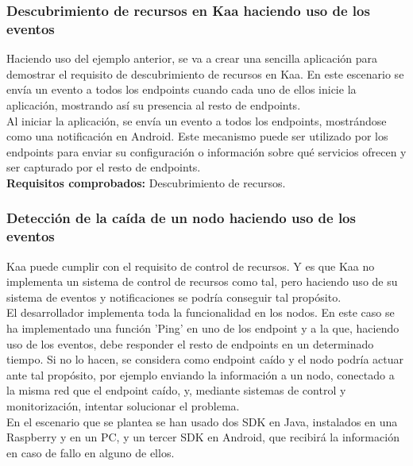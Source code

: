 \documentclass[12pt, twoside]{book}
\begin{document}
\subsubsection*{Descubrimiento de recursos en Kaa haciendo uso de los eventos}
Haciendo uso del ejemplo anterior, se va a crear una sencilla aplicación para demostrar el requisito de descubrimiento de recursos en Kaa. En este escenario se envía un evento a todos los endpoints cuando cada uno de ellos inicie la aplicación, mostrando así su presencia al resto de endpoints.\\
Al iniciar la aplicación, se envía un evento a todos los endpoints, mostrándose como una notificación en Android. Este mecanismo puede ser utilizado por los endpoints para enviar su configuración o información sobre qué servicios ofrecen y ser capturado por el resto de endpoints.\\
\textbf{Requisitos comprobados: } Descubrimiento de recursos.

\subsubsection*{Detección de la caída de un nodo haciendo uso de los eventos}
Kaa puede cumplir con el requisito de control de recursos. Y es que Kaa  no implementa un sistema de control de recursos como tal, pero haciendo uso de su sistema de eventos y notificaciones se podría conseguir tal propósito.\\
El desarrollador implementa toda la funcionalidad en los nodos. En este caso se ha implementado una función 'Ping' en uno de los endpoint y a la que, haciendo uso de los eventos, debe responder el resto de endpoints en un determinado tiempo. Si no lo hacen, se considera como endpoint caído y el nodo podría actuar ante tal propósito, por ejemplo enviando la información a un nodo, conectado a la misma red que el endpoint caído, y, mediante sistemas de control y monitorización, intentar solucionar el problema. \\
En el escenario que se plantea se han usado dos SDK en Java, instalados en una Raspberry y en un PC, y un tercer SDK en Android, que recibirá la información en caso de fallo en alguno de ellos.\\
\end{document}
